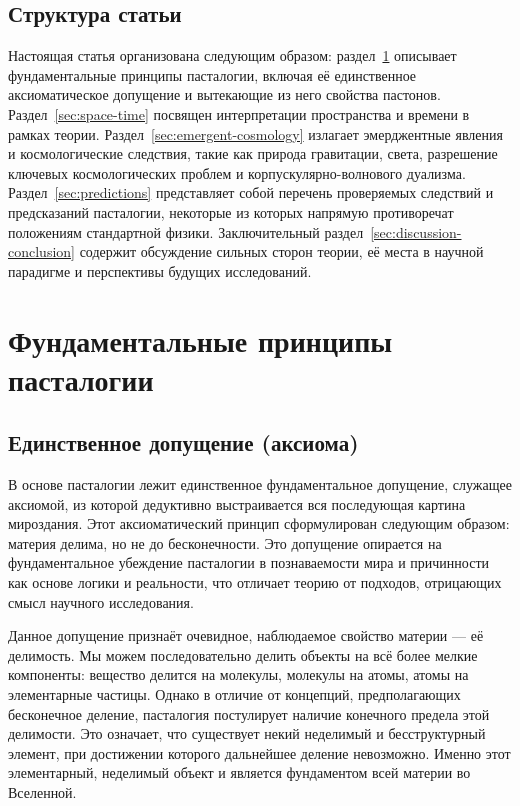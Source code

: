 \documentclass[pdflatex,sn-mathphys-num,referee]{sn-jnl}
\begin{document}
\subsection{Структура статьи}\label{subsec:structure}

Настоящая статья организована следующим образом: раздел~\ref{sec:fundamentals} описывает фундаментальные принципы пасталогии, включая её единственное аксиоматическое допущение и вытекающие из него свойства пастонов. Раздел~\ref{sec:space-time} посвящен интерпретации пространства и времени в рамках теории. Раздел~\ref{sec:emergent-cosmology} излагает эмерджентные явления и космологические следствия, такие как природа гравитации, света, разрешение ключевых космологических проблем и корпускулярно-волнового дуализма. Раздел~\ref{sec:predictions} представляет собой перечень проверяемых следствий и предсказаний пасталогии, некоторые из которых напрямую противоречат положениям стандартной физики. Заключительный раздел~\ref{sec:discussion-conclusion} содержит обсуждение сильных сторон теории, её места в научной парадигме и перспективы будущих исследований.

\section{Фундаментальные принципы пасталогии}\label{sec:fundamentals}

\subsection{Единственное допущение (аксиома)}\label{subsec:axiom}

В основе пасталогии лежит единственное фундаментальное допущение, служащее аксиомой, из которой дедуктивно выстраивается вся последующая картина мироздания. Этот аксиоматический принцип сформулирован следующим образом: материя делима, но не до бесконечности. Это допущение опирается на фундаментальное убеждение пасталогии в познаваемости мира и причинности как основе логики и реальности, что отличает теорию от подходов, отрицающих смысл научного исследования.

Данное допущение признаёт очевидное, наблюдаемое свойство материи --- её делимость. Мы можем последовательно делить объекты на всё более мелкие компоненты: вещество делится на молекулы, молекулы на атомы, атомы на элементарные частицы. Однако в отличие от концепций, предполагающих бесконечное деление, пасталогия постулирует наличие конечного предела этой делимости. Это означает, что существует некий неделимый и бесструктурный элемент, при достижении которого дальнейшее деление невозможно. Именно этот элементарный, неделимый объект и является фундаментом всей материи во Вселенной.
\end{document}
